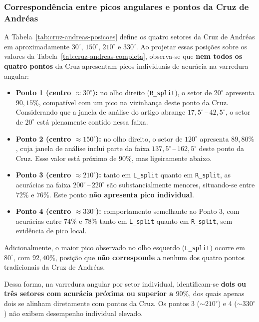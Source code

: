 \documentclass[11pt,a4paper]{article}
\begin{document}
\subsubsection{Correspondência entre picos angulares e pontos da Cruz de Andréas}

A Tabela~\ref{tab:cruz-andreas-posicoes} define os quatro setores da Cruz de Andréas em aproximadamente \(30^\circ\), \(150^\circ\), \(210^\circ\) e \(330^\circ\). Ao projetar essas posições sobre os valores da Tabela~\ref{tab:cruz-andreas-completa}, observa-se que \textbf{nem todos os quatro pontos} da Cruz apresentam picos individuais de acurácia na varredura angular:

\begin{itemize}
    \item \textbf{Ponto 1 (centro \(\approx 30^\circ\)):} no olho direito (\texttt{R\_split}), o setor de \(20^\circ\) apresenta \(90{,}15\%\), compatível com um pico na vizinhança deste ponto da Cruz. Considerando que a janela de análise do artigo abrange \(17{,}5^\circ\)\,--\,\(42{,}5^\circ\), o setor de \(20^\circ\) está plenamente contido nessa faixa.
    \item \textbf{Ponto 2 (centro \(\approx 150^\circ\)):} no olho direito, o setor de \(120^\circ\) apresenta \(89{,}80\%\), cuja janela de análise inclui parte da faixa \(137{,}5^\circ\)\,--\,\(162{,}5^\circ\) deste ponto da Cruz. Esse valor está próximo de \(90\%\), mas ligeiramente abaixo.
    \item \textbf{Ponto 3 (centro \(\approx 210^\circ\)):} tanto em \texttt{L\_split} quanto em \texttt{R\_split}, as acurácias na faixa \(200^\circ\)\,--\,\(220^\circ\) são substancialmente menores, situando-se entre \(72\%\) e \(76\%\). Este ponto \textbf{não apresenta pico individual}.
    \item \textbf{Ponto 4 (centro \(\approx 330^\circ\)):} comportamento semelhante ao Ponto 3, com acurácias entre \(74\%\) e \(78\%\) tanto em \texttt{L\_split} quanto em \texttt{R\_split}, sem evidência de pico local.
\end{itemize}

Adicionalmente, o maior pico observado no olho esquerdo (\texttt{L\_split}) ocorre em \(80^\circ\), com \(92{,}40\%\), posição que \textbf{não corresponde} a nenhum dos quatro pontos tradicionais da Cruz de Andréas.

Dessa forma, na varredura angular por setor individual, identificam-se \textbf{dois ou três setores com acurácia próxima ou superior a \(90\%\)}, dos quais apenas dois se alinham diretamente com pontos da Cruz. Os pontos 3 (\(\sim 210^\circ\)) e 4 (\(\sim 330^\circ\)) não exibem desempenho individual elevado.
\end{document}
